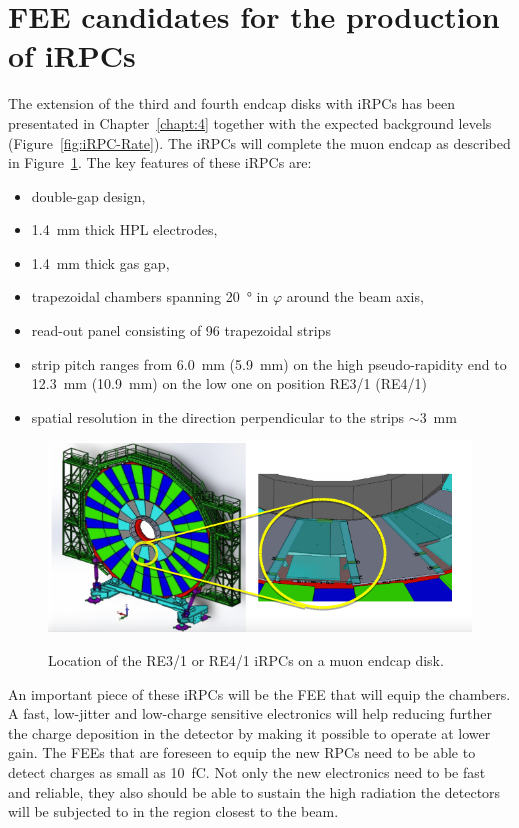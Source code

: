 \section{FEE candidates for the production of iRPCs}
\label{chapt6:sec:candidates}

	The extension of the third and fourth endcap disks with \acl{iRPC}s has been presentated in Chapter~\ref{chapt:4} together with the expected background levels (Figure~\ref{fig:iRPC-Rate}). The iRPCs will complete the muon endcap as described in Figure~\ref{fig:iRPC-Wheel}. The key features of these iRPCs are:

	\begin{itemize}
		\item double-gap design,
		\item \SI{1.4}{mm} thick HPL electrodes,
		\item \SI{1.4}{mm} thick gas gap,
		\item trapezoidal chambers spanning \SI{20}{\degree} in $\varphi$ around the beam axis,
		\item read-out panel consisting of 96 trapezoidal strips
		\item strip pitch ranges from \SI{6.0}{mm} (\SI{5.9}{mm}) on the high pseudo-rapidity end to \SI{12.3}{mm} (\SI{10.9}{mm}) on the low one on position RE3/1 (RE4/1)
		\item spatial resolution in the direction perpendicular to the strips $\sim$\SI{3}{mm}
	\end{itemize}
	
	\begin{figure}[H]
		\centering
		\includegraphics[width = .8\linewidth]{fig/chapt6/iRPC-Wheel.png}\\
		\caption{\label{fig:iRPC-Wheel} Location of the RE3/1 or RE4/1 iRPCs on a muon endcap disk.}
	\end{figure}

	An important piece of these iRPCs will be the \acl{FEE} that will equip the chambers. A fast, low-jitter and low-charge sensitive electronics will help reducing further the charge deposition in the detector by making it possible to operate at lower gain. The FEEs that are foreseen to equip the new RPCs need to be able to detect charges as small as \SI{10}{fC}. Not only the new electronics need to be fast and reliable, they also should be able to sustain the high radiation the detectors will be subjected to in the region closest to the beam.
	
